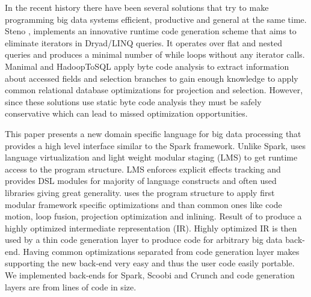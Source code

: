 In the recent history there have been several solutions that try to make programming big data systems efficient, productive and general at the same time. Steno \cite{murray_steno:_2011}, implements an innovative runtime code generation scheme that aims to eliminate iterators in Dryad/LINQ queries. It operates over flat and nested queries and produces a minimal number of while loops without any iterator calls. Manimal \cite{jahani_automatic_2011} and HadoopToSQL \cite{iu_hadooptosql:_2010} apply byte code analysis to extract information about accessed fields and selection branches to gain enough knowledge to apply common relational database optimizations for projection and selection. However, since these solutions use static byte code analysis they must be safely conservative which can lead to missed optimization opportunities.         

This paper presents a new domain specific language \tool for big data processing that provides a high level interface similar to the Spark framework. Unlike Spark, \tool uses language virtualization \cite{moors_scala-virtualized_2012} and light weight modular staging (LMS)\cite{rompf_lightweight_2010} to get runtime access to the program structure. LMS enforces explicit effects tracking and provides DSL modules for majority of language constructs and often used libraries giving \tool great generality. \tool uses the program structure to apply first modular framework specific optimizations and than common ones like code motion, loop fusion, projection optimization and inlining. Result of to produce a highly optimized intermediate representation (IR). Highly optimized IR is then used by a thin code generation layer to produce code for arbitrary big data back-end. Having common optimizations separated from code generation layer makes supporting the new back-end very easy and thus the user code easily portable. We implemented back-ends for Spark, Scoobi \cite{nicta_scoobi_2012} and Crunch \cite{_crunch_2012} and code generation layers are from  lines of code in size. 

 

